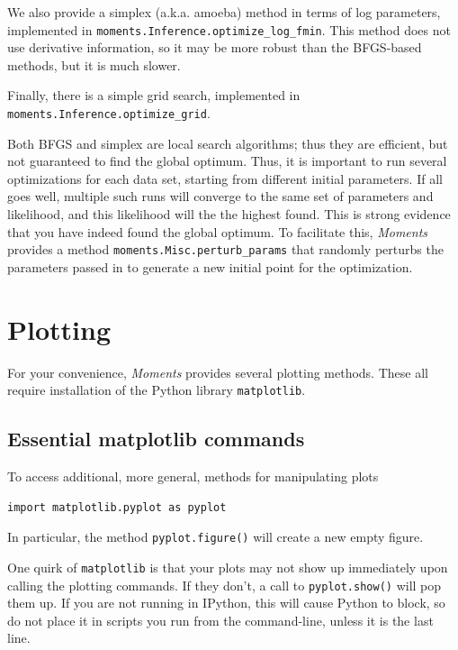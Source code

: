 \documentclass[12pt]{article}
\makeatletter
\newcommand{\py}[1]{\lstinline[language=Python, showstringspaces=False]@#1@}
\makeatother
\begin{document}
We also provide a simplex (a.k.a. amoeba) method in terms of log parameters, implemented in \py{moments.Inference.optimize_log_fmin}.
This method does not use derivative information, so it may be more robust than the BFGS-based methods, but it is much slower.

Finally, there is a simple grid search, implemented in \py{moments.Inference.optimize_grid}.

Both BFGS and simplex are local search algorithms; thus they are efficient, but not guaranteed to find the global optimum.
Thus, it is important to run several optimizations for each data set, starting from different initial parameters.
If all goes well, multiple such runs will converge to the same set of parameters and likelihood, and this likelihood will the the highest found.
This is strong evidence that you have indeed found the global optimum.
To facilitate this, \textit{Moments} provides a method \py{moments.Misc.perturb_params} that randomly perturbs the parameters passed in to generate a new initial point for the optimization.



\section{Plotting}

For your convenience, \textit{Moments} provides several plotting methods.
These all require installation of the Python library \py{matplotlib}.

\subsection{Essential matplotlib commands}
To access additional, more general, methods for manipulating plots
\begin{lstlisting}
import matplotlib.pyplot as pyplot
\end{lstlisting}
In particular, the method \py{pyplot.figure()} will create a new empty figure.

One quirk of \py{matplotlib} is that your plots may not show up immediately upon calling the plotting commands.
If they don't, a call to \py{pyplot.show()} will pop them up.
If you are not running in IPython, this will cause Python to block, so do not place it in scripts you run from the command-line, unless it is the last line.
\end{document}
